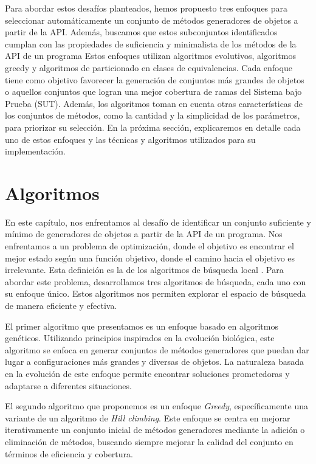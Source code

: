 Para abordar estos desafíos planteados, hemos propuesto tres enfoques para seleccionar automáticamente un conjunto de métodos generadores de objetos a partir de la API. Además, buscamos que estos subconjuntos identificados cumplan con las propiedades de suficiencia y minimalista de los métodos de la API de un programa  Estos enfoques utilizan algoritmos evolutivos, algoritmos greedy y algoritmos de particionado en clases de equivalencias. Cada enfoque tiene como objetivo favorecer la generación de conjuntos más grandes de objetos o aquellos conjuntos que logran una mejor cobertura de ramas del Sistema bajo Prueba (SUT). Además, los algoritmos toman en cuenta otras características de los conjuntos de métodos, como la cantidad y la simplicidad de los parámetros, para priorizar su selección. En la próxima sección, explicaremos en detalle cada uno de estos enfoques y las técnicas y algoritmos utilizados para su implementación.

\section{Algoritmos}
\label{sec:algorithms}


En este capítulo, nos enfrentamos al desafío de identificar un conjunto suficiente y mínimo de generadores de objetos a partir de la API de un programa. Nos enfrentamos a un problema de optimización, donde el objetivo es encontrar el mejor estado según una función objetivo, donde el camino hacia el objetivo es irrelevante. Esta definición es la de los algoritmos de búsqueda local \cite{Russell:2009}. Para abordar este problema, desarrollamos tres algoritmos de búsqueda, cada uno con su enfoque único. Estos algoritmos nos permiten explorar el espacio de búsqueda de manera eficiente y efectiva.

El primer algoritmo que presentamos es un enfoque basado en algoritmos genéticos. Utilizando principios inspirados en la evolución biológica, este algoritmo se enfoca en generar conjuntos de métodos generadores que puedan dar lugar a configuraciones más grandes y diversas de objetos. La naturaleza basada en la evolución de este enfoque permite encontrar soluciones prometedoras y adaptarse a diferentes situaciones.

El segundo algoritmo que proponemos es un enfoque \emph{Greedy}, específicamente una variante de un algoritmo de \emph{Hill climbing}. Este enfoque se centra en mejorar iterativamente un conjunto inicial de métodos generadores mediante la adición o eliminación de métodos, buscando siempre mejorar la calidad del conjunto en términos de eficiencia y cobertura.

